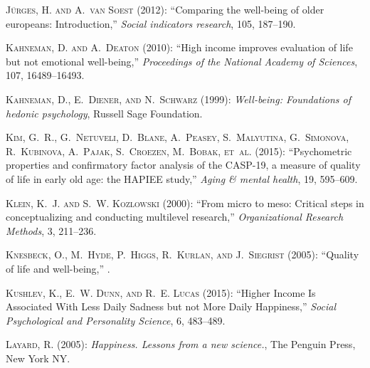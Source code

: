 \documentclass[10pt, letterpaper]{article}
\begin{document}
\begin{spacing}{1.4}
\begin{thebibliography}{87}
\textsc{J{\"u}rges, H. and A.~van Soest} (2012): \enquote{Comparing the
  well-being of older europeans: Introduction,} \emph{Social indicators
  research}, 105, 187--190.

\textsc{Kahneman, D. and A.~Deaton} (2010): \enquote{High income improves
  evaluation of life but not emotional well-being,} \emph{Proceedings of the
  National Academy of Sciences}, 107, 16489--16493.

\textsc{Kahneman, D., E.~Diener, and N.~Schwarz} (1999): \emph{Well-being:
  Foundations of hedonic psychology}, Russell Sage Foundation.

\textsc{Kim, G.~R., G.~Netuveli, D.~Blane, A.~Peasey, S.~Malyutina,
  G.~Simonova, R.~Kubinova, A.~Pajak, S.~Croezen, M.~Bobak, et~al.} (2015):
  \enquote{Psychometric properties and confirmatory factor analysis of the
  CASP-19, a measure of quality of life in early old age: the HAPIEE study,}
  \emph{Aging \& mental health}, 19, 595--609.

\textsc{Klein, K.~J. and S.~W. Kozlowski} (2000): \enquote{From micro to meso:
  Critical steps in conceptualizing and conducting multilevel research,}
  \emph{Organizational Research Methods}, 3, 211--236.

\textsc{Knesbeck, O., M.~Hyde, P.~Higgs, R.~Kurlan, and J.~Siegrist} (2005):
  \enquote{Quality of life and well-being,} .

\textsc{Kushlev, K., E.~W. Dunn, and R.~E. Lucas} (2015): \enquote{Higher
  Income Is Associated With Less Daily Sadness but not More Daily Happiness,}
  \emph{Social Psychological and Personality Science}, 6, 483--489.

\textsc{Layard, R.} (2005): \emph{Happiness. Lessons from a new science.}, The
  Penguin Press, New York NY.


\end{thebibliography}
\end{spacing}
\end{document}
